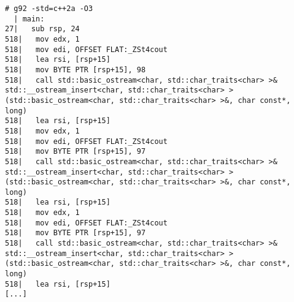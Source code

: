 \begin{lstlisting}[language={},numbers=none,title=\href{https://godbolt.org/z/jpCb6h}{\texttt{godbolt.org/z/jpCb6h}}]
# g92 -std=c++2a -O3
  | main:
27|   sub rsp, 24
518|   mov edx, 1
518|   mov edi, OFFSET FLAT:_ZSt4cout
518|   lea rsi, [rsp+15]
518|   mov BYTE PTR [rsp+15], 98
518|   call std::basic_ostream<char, std::char_traits<char> >& std::__ostream_insert<char, std::char_traits<char> >(std::basic_ostream<char, std::char_traits<char> >&, char const*, long)
518|   lea rsi, [rsp+15]
518|   mov edx, 1
518|   mov edi, OFFSET FLAT:_ZSt4cout
518|   mov BYTE PTR [rsp+15], 97
518|   call std::basic_ostream<char, std::char_traits<char> >& std::__ostream_insert<char, std::char_traits<char> >(std::basic_ostream<char, std::char_traits<char> >&, char const*, long)
518|   lea rsi, [rsp+15]
518|   mov edx, 1
518|   mov edi, OFFSET FLAT:_ZSt4cout
518|   mov BYTE PTR [rsp+15], 97
518|   call std::basic_ostream<char, std::char_traits<char> >& std::__ostream_insert<char, std::char_traits<char> >(std::basic_ostream<char, std::char_traits<char> >&, char const*, long)
518|   lea rsi, [rsp+15]
[...]
\end{lstlisting}
